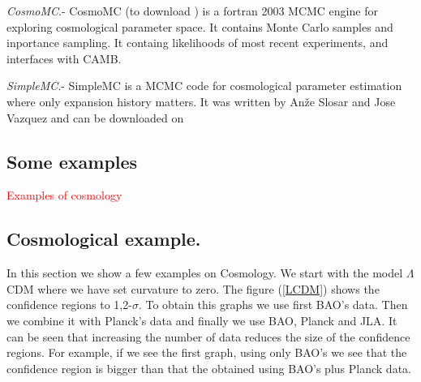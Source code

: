 \documentclass[onecolumn,           %
               showpacs,            %
               preprintnumbers,     %
               aps,                 %
               prl,          	    %
               letterpaper,             %
               superscriptaddress,      %
               nofootinbib,         %
               tightenlines,        %
               floats,floatfix      %
               ,usenatbib,
               ]{revtex4-1}
\begin{document}
\textit{CosmoMC}.- CosmoMC (to download \cite{cosmomc}) is a fortran 2003 MCMC engine for exploring cosmological parameter space. It contains Monte Carlo samples and inportance sampling. It containg likelihoods of most recent experiments, and interfaces with CAMB.

\textit{SimpleMC}.- SimpleMC is a MCMC code for cosmological parameter estimation where only expansion history matters. It was written by Anže Slosar and Jose Vazquez and can be downloaded on \cite{simplemc}

\subsection{Some examples}
\textcolor{red}{Examples of cosmology}
\subsection{Cosmological example.}
In this section we show a few examples on Cosmology. We start with the model $\Lambda$CDM where we have set curvature to zero. The figure (\ref{LCDM}) shows the confidence regions to 1,2-$\sigma$. To obtain this graphs we use first BAO's data. Then we combine it with Planck's data and finally we use BAO, Planck and JLA. It can be seen that increasing the number of data reduces the size of the confidence regions. For example, if we see the first graph, using only BAO's we see that the confidence region is bigger than that the obtained using BAO's plus Planck data. 
\end{document}
